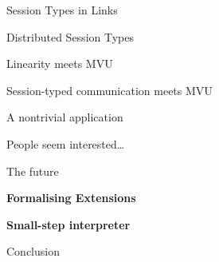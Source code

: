 \documentclass[11.5pt, aspectratio=169]{beamer}
\begin{document}

\begin{frame}{Session Types in Links}
\end{frame}

\begin{frame}{Distributed Session Types}
\end{frame}

\begin{frame}{Linearity meets MVU}
\end{frame}

\begin{frame}{Session-typed communication meets MVU}
\end{frame}

\begin{frame}{A nontrivial application}
\end{frame}

\begin{frame}{People seem interested\ldots}
\end{frame}


\begin{frame}{The future}
  \begin{fullpageitemize}
    \item {\large \textbf{Formalising Extensions}}
    \item {\large \textbf{Small-step interpreter}}
  \end{fullpageitemize}
\end{frame}

\begin{frame}{Conclusion}
\end{frame}
\end{document}
